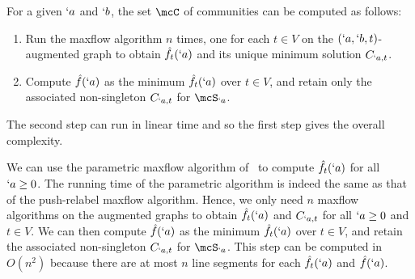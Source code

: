 
For a given $`a$ and $`b$, the set $\mcC$ of communities can be computed as follows:
\begin{enumerate}
\item Run the maxflow algorithm $n$ times, one for each $t\in V$ on the $(`a,`b,t)$-augmented graph to obtain $\hat{f}_t(`a)$ and its unique minimum solution $C_{`a,t}$.
\item Compute $\hat{f}(`a)$ as the minimum $\hat{f}_t(`a)$ over $t\in V$, and retain only the associated non-singleton $C_{`a, t}$ for $\mcS_{`a}$. 
\end{enumerate}
The second step can run in linear time and so the first step gives the overall complexity.

We can use the parametric maxflow algorithm of~\cite{gallo89} to compute $\hat{f}_t(`a)$ for all $`a\geq 0$. The running time of the parametric algorithm is indeed the same as that of the push-relabel maxflow algorithm. Hence, we only need $n$ maxflow algorithms on the augmented graphs to obtain $\hat{f}_t(`a)$ and $C_{`a,t}$ for all $`a\geq 0$ and $t\in V$. We can then compute $\hat{f}(`a)$ as the minimum $\hat{f}_t(`a)$ over $t\in V$, and retain the associated non-singleton $C_{`a,t}$ for $\mcS_{`a}$. This step can be computed in $O(n^2)$ because there are at most $n$ line segments for each $\hat{f}_t(`a)$ and $\hat{f}(`a)$. 

